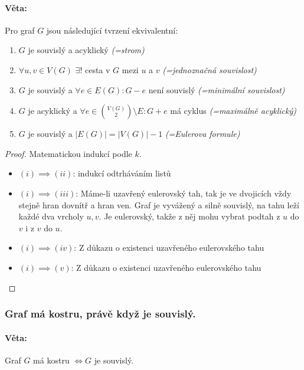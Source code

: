 \documentclass[10pt,a4paper]{article}
\begin{document}
\paragraph*{Věta: } Pro graf $G$ jsou následující tvrzení ekvivalentní:
\begin{enumerate}[label=(\roman*)]
    \item $G$ je souvislý a acyklický \textit{(=strom)}
    \item $\forall u,v\in V(G)$ $\exists!$ cesta v $G$ mezi $u$ a $v$ \textit{(=jednoznačná souvislost)}
    \item $G$ je souvislý a $\forall e\in E(G): G-e$ není souvislý \textit{(=minimální souvislost)}
    \item $G$ je acyklický a $\forall e\in \binom{V(G)}{2}\setminus E: G+e$ má cyklus \textit{(=maximálně acyklický)}
    \item $G$ je souvislý a $|E(G)| = |V(G)| - 1$ \textit{(=Eulerova formule)}
\end{enumerate}
\begin{proof} Matematickou indukcí podle $k$.
    \begin{itemize}
        \item [ ] $(i) \implies (ii)$: indukcí odtrháváním listů
        \item [ ] $(i) \implies (iii)$: Máme-li uzavřený eulerovský tah, tak je ve dvojicích vždy stejně hran dovnítř a hran ven. Graf je vyvážený a silně souvislý, na tahu leží každé dva vrcholy $u, v$. Je eulerovský, takže z něj mohu vybrat podtah z $u$ do $v$ i z $v$ do $u$.
        \item [ ] $(i) \implies (iv)$: Z důkazu o existenci uzavřeného eulerovského tahu
        \item [ ] $(i) \implies (v)$: Z důkazu o existenci uzavřeného eulerovského tahu
    \end{itemize}
\end{proof}

\subsubsection{Graf má kostru, právě když je souvislý.}
\paragraph*{Věta: } Graf $G$ má kostru $\iff G$ je souvislý.
\end{document}
